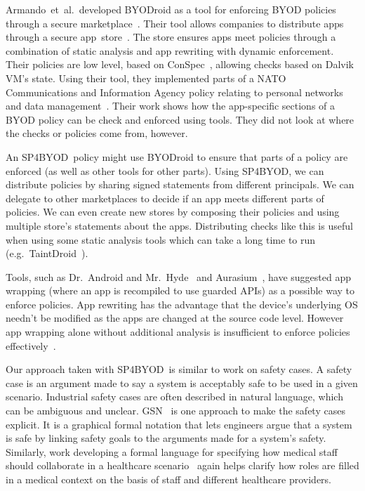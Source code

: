 \documentclass{llncs}
\makeatletter
\newcommand{\etal}{et~al.\@}
\newcommand{\AppPAL}[0]{SP4BYOD}
\makeatother
\begin{document}
Armando~\etal~developed BYODroid as a tool for enforcing BYOD policies through a secure marketplace~\cite{armando_bring_2013}.
Their tool allows companies to distribute apps through a secure app~store~\cite{armando_enabling_2014}.
The store ensures apps meet policies through a combination of static analysis and app rewriting with dynamic enforcement.
Their policies are low level, based on ConSpec~\cite{aktug_conspec_2008}, allowing checks based on Dalvik VM's state.
Using their tool, they implemented parts of a NATO Communications and Information Agency policy relating to personal networks and data management~\cite{armando_developing_2016}.
Their work shows how the app-specific sections of a BYOD policy can be check and enforced using tools.
They did not look at where the checks or policies come from, however.

An \AppPAL~policy might use BYODroid to ensure that parts of a policy are enforced (as well as other tools for other parts).
Using \AppPAL, we can distribute policies by sharing signed statements from different principals.
We can delegate to other marketplaces to decide if an app meets different parts of policies.
We can even create new stores by composing their policies and using multiple store's statements about the apps.
Distributing checks like this is useful when using some static analysis tools which can take a long time to run (e.g.~TaintDroid~\cite{enck_taintdroid:_2014}).

Tools, such as Dr.~Android and Mr.~Hyde~\cite{jeon_dr._2012} and Aurasium~\cite{xu_aurasium:_2012}, have suggested app wrapping (where an app is recompiled to use guarded APIs) as a possible way to enforce policies.
App rewriting has the advantage that the device's underlying OS needn't be modified as the apps are changed at the source code level.
However app wrapping alone without additional analysis is insufficient to enforce policies effectively~\cite{hao_effectiveness_2013}.

Our approach taken with \AppPAL~is similar to work on safety cases.
A safety case is an argument made to say a system is acceptably safe to be used in a given scenario.
Industrial safety cases are often described in natural language, which can be ambiguous and unclear.
\ac{GSN}~\cite{tim_kelly_goal_2004} is one approach to make the safety cases explicit.
It is a graphical formal notation that lets engineers argue that a system is safe by linking safety goals to the arguments made for a system's safety.
Similarly, work developing a formal language for specifying how medical staff should collaborate in a healthcare scenario~\cite{papapanagiotou_formal_2014} again helps clarify how roles are filled in a medical context on the basis of staff and different healthcare providers.
\end{document}
